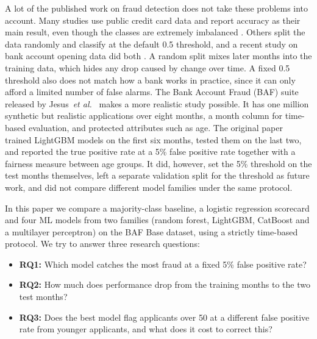 A lot of the published work on fraud detection does not take these problems into account. Many
studies use public credit card data and report accuracy as their main result, even though the
classes are extremely imbalanced \cite{alarfaj2022credit, taha2020intelligent}. Others split the
data randomly and classify at the default 0.5 threshold, and a recent study on bank account opening
data did both \cite{sun2025objective}. A random split mixes later months into the training data,
which hides any drop caused by change over time. A fixed 0.5 threshold also does not match how a
bank works in practice, since it can only afford a limited number of false alarms. The Bank Account
Fraud (BAF) suite released by Jesus~\textit{et al.}~\cite{jesus2022turning} makes a more realistic
study possible. It has one million synthetic but realistic applications over eight months, a month
column for time-based evaluation, and protected attributes such as age. The original paper trained
LightGBM models on the first six months, tested them on the last two, and reported the true positive
rate at a 5\% false positive rate together with a fairness measure between age groups. It did,
however, set the 5\% threshold on the test months themselves, left a separate validation split for
the threshold as future work, and did not compare different model families under the same protocol.

In this paper we compare a majority-class baseline, a logistic regression scorecard and four ML
models from two families (random forest, LightGBM, CatBoost and a multilayer perceptron) on the BAF
Base dataset, using a strictly time-based protocol. We try to answer three research questions:
\begin{itemize}
  \item \textbf{RQ1:} Which model catches the most fraud at a fixed 5\% false positive rate?
  \item \textbf{RQ2:} How much does performance drop from the training months to the two test months?
  \item \textbf{RQ3:} Does the best model flag applicants over 50 at a different false positive rate
        from younger applicants, and what does it cost to correct this?
\end{itemize}

